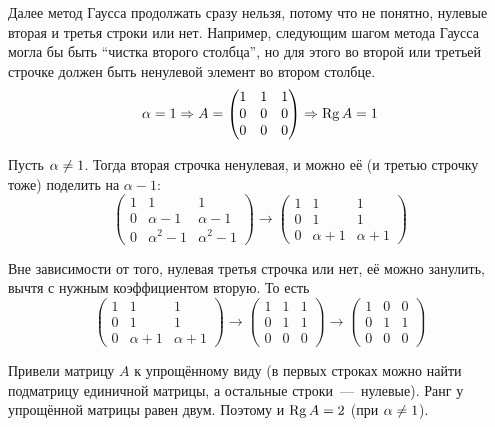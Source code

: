 \documentclass[a4paper,12pt]{article}
\begin{document}
\begin{solution}
    Далее метод Гаусса продолжать сразу нельзя, потому что не понятно, нулевые вторая и третья строки или нет.
    Например, следующим шагом метода Гаусса могла бы быть ``чистка второго столбца'', но для этого во второй или третьей строчке должен быть ненулевой элемент во втором столбце.
    \[
      \alpha = 1 \Rightarrow A = \begin{pmatrix}
        1 & 1 & 1\\
        0 & 0 & 0\\
        0 & 0 & 0
      \end{pmatrix} \Rightarrow \operatorname{Rg} A = 1
    \]
    
    Пусть $\alpha \hm{\not=} 1$.
    Тогда вторая строчка ненулевая, и можно её (и третью строчку тоже) поделить на $\alpha - 1$:
    \[
      \begin{pmatrix}
        1 & 1 & 1\\
        0 & \alpha - 1 & \alpha - 1\\
        0 & \alpha^2 - 1 & \alpha^2 - 1
      \end{pmatrix}
      \longrightarrow
      \begin{pmatrix}
        1 & 1 & 1\\
        0 & 1 & 1\\
        0 & \alpha + 1 & \alpha + 1
      \end{pmatrix}
    \]
    
    Вне зависимости от того, нулевая третья строчка или нет, её можно занулить, вычтя с нужным коэффициентом вторую.
    То есть
    \[
      \begin{pmatrix}
        1 & 1 & 1\\
        0 & 1 & 1\\
        0 & \alpha + 1 & \alpha + 1
      \end{pmatrix}
      \longrightarrow
      \begin{pmatrix}
        1 & 1 & 1\\
        0 & 1 & 1\\
        0 & 0 & 0
      \end{pmatrix}
      \longrightarrow
      \begin{pmatrix}
        1 & 0 & 0\\
        0 & 1 & 1\\
        0 & 0 & 0
      \end{pmatrix}
    \]
    
    Привели матрицу $A$ к упрощённому виду (в первых строках можно найти подматрицу единичной матрицы, а остальные строки~---~нулевые).
    Ранг у упрощённой матрицы равен двум.
    Поэтому и $\Rg A \hm= 2$ (при $\alpha \hm{\not=} 1$).
  \end{solution}
\end{document}
